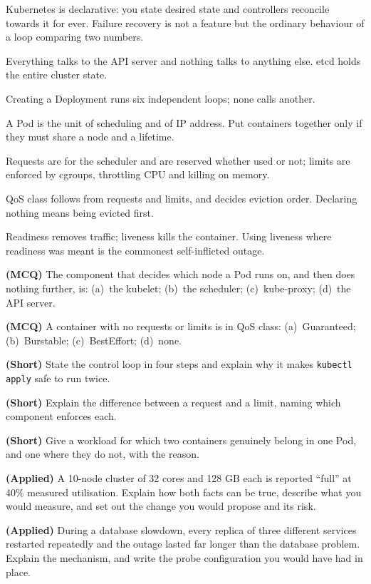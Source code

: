 \begin{chaptersummary}
\begin{tight}
  \item Kubernetes is declarative: you state desired state and controllers
        reconcile towards it for ever. Failure recovery is not a feature but
        the ordinary behaviour of a loop comparing two numbers.
  \item Everything talks to the API server and nothing talks to anything else.
        etcd holds the entire cluster state.
  \item Creating a Deployment runs six independent loops; none calls another.
  \item A Pod is the unit of scheduling and of IP address. Put containers
        together only if they must share a node and a lifetime.
  \item Requests are for the scheduler and are reserved whether used or not;
        limits are enforced by cgroups, throttling CPU and killing on memory.
  \item QoS class follows from requests and limits, and decides eviction
        order. Declaring nothing means being evicted first.
  \item Readiness removes traffic; liveness kills the container. Using liveness
        where readiness was meant is the commonest self-inflicted outage.
\end{tight}
\end{chaptersummary}

\begin{reviewq}
  \item \textbf{(MCQ)} The component that decides which node a Pod runs on,
        and then does nothing further, is: (a)~the kubelet; (b)~the scheduler;
        (c)~kube-proxy; (d)~the API server.
  \item \textbf{(MCQ)} A container with no requests or limits is in QoS class:
        (a)~Guaranteed; (b)~Burstable; (c)~BestEffort; (d)~none.
  \item \textbf{(Short)} State the control loop in four steps and explain why
        it makes \texttt{kubectl apply} safe to run twice.
  \item \textbf{(Short)} Explain the difference between a request and a limit,
        naming which component enforces each.
  \item \textbf{(Short)} Give a workload for which two containers genuinely
        belong in one Pod, and one where they do not, with the reason.
  \item \textbf{(Applied)} A 10-node cluster of 32 cores and 128 GB each is
        reported ``full'' at 40\% measured utilisation. Explain how both facts
        can be true, describe what you would measure, and set out the change
        you would propose and its risk.
  \item \textbf{(Applied)} During a database slowdown, every replica of three
        different services restarted repeatedly and the outage lasted far
        longer than the database problem. Explain the mechanism, and write the
        probe configuration you would have had in place.
\end{reviewq}
